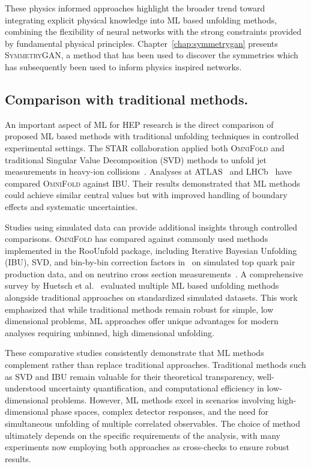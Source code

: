     These physics informed approaches highlight the broader trend toward integrating explicit physical knowledge into ML based unfolding methods, combining the flexibility of neural networks with the strong constraints provided by fundamental physical principles.
    Chapter~\ref{chap:symmetrygan} presents \textsc{SymmetryGAN}, a method that has been used to discover the symmetries which has subsequently been used to inform physics inspired networks.

\subsection{Comparison with traditional methods.}
    An important aspect of ML for HEP research is the direct comparison of proposed ML based methods with traditional unfolding techniques in controlled experimental settings.
    The STAR collaboration applied both \textsc{OmniFold} and traditional Singular Value Decomposition (SVD) methods to unfold jet measurements in heavy-ion collisions~\cite{song_measurement_2023}.
    Analyses at ATLAS~\cite{collaboration_measurement_2025} and LHCb~\cite{collaboration_multidifferential_2023} have compared \textsc{OmniFold} against IBU.
    Their results demonstrated that ML methods could achieve similar central values but with improved handling of boundary effects and systematic uncertainties.
    
    Studies using simulated data can provide additional insights through controlled comparisons.
    \textsc{OmniFold} has compared against commonly used methods implemented in the RooUnfold package, including Iterative Bayesian Unfolding (IBU), SVD, and bin-by-bin correction factors in~\cite{Baron:2021vvl} on simulated top quark pair production data, and on neutrino cross section measurements~\cite{Huang2025MachineTechnique}.
    A comprehensive survey by Huetsch et al.~\cite{Huetsch:2024quz} evaluated multiple ML based unfolding methods alongside traditional approaches on standardized simulated datasets.
    This work emphasized that while traditional methods remain robust for simple, low dimensional problems, ML approaches offer unique advantages for modern analyses requiring unbinned, high dimensional unfolding.

    These comparative studies consistently demonstrate that ML methods complement rather than replace traditional approaches.
    Traditional methods such as SVD and IBU remain valuable for their theoretical transparency, well-understood uncertainty quantification, and computational efficiency in low-dimensional problems.
    However, ML methods excel in scenarios involving high-dimensional phase spaces, complex detector responses, and the need for simultaneous unfolding of multiple correlated observables.
    The choice of method ultimately depends on the specific requirements of the analysis, with many experiments now employing both approaches as cross-checks to ensure robust results.
    
